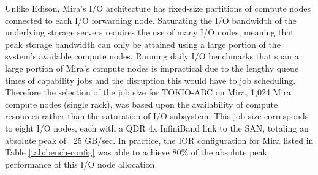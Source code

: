 Unlike Edison, Mira's I/O architecture has fixed-size partitions of compute nodes connected to each I/O forwarding node.
Saturating the I/O bandwidth of the underlying storage servers requires the use of many I/O nodes, meaning that peak storage bandwidth can only be attained using a large portion of the system's available compute nodes.
Running daily I/O benchmarks that span a large portion of Mira's compute nodes is impractical due to the lengthy queue times of capability jobs and the disruption this would have to job scheduling.
Therefore the selection of the job size for TOKIO-ABC on Mira, 1,024 Mira compute nodes (single rack), was based upon the availability of compute resources rather than the saturation of
I/O subsystem.
This job size corresponds to eight I/O nodes, each with a QDR 4x InfiniBand link to the SAN, totaling an absolute peak of ~25 GB/sec.
In practice, the IOR configuration for Mira listed in Table \ref{tab:bench-config} was able to achieve 80\% of the absolute peak performance of this I/O node allocation.
